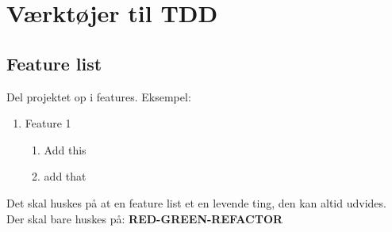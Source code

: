 \documentclass{article}
\begin{document}
\section{Værktøjer til TDD}
\subsection{Feature list}
Del projektet op i features. Eksempel: 
\begin{enumerate}
 	\item Feature 1
 	\begin{enumerate}
 		\item Add this
 		\item add that
 	\end{enumerate}
 \end{enumerate} 
Det skal huskes på at en feature list et en levende ting, den kan altid udvides. Der skal bare huskes på: \textbf{RED-GREEN-REFACTOR}
\end{document}
